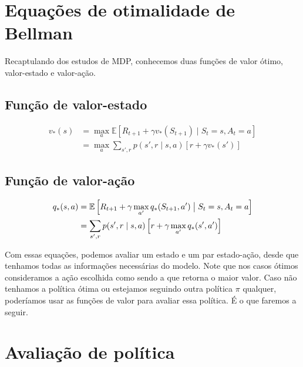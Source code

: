 \documentclass{article}
\begin{document}
    \section{Equações de otimalidade de Bellman}
    
        Recaptulando dos estudos de MDP, conhecemos duas funções de valor ótimo, valor-estado e valor-ação.
    
        \subsection{Função de valor-estado}
        
            \begin{equation}
                \begin{split}
                    v_*(s) & = \max_a \mathbb{E} \left[ R_{t+1} + \gamma v_*(S_{t+1}) \mid S_t = s, A_t = a \right] \\
                    & = \max_a \sum_{s', r} p(s',r \mid s,a) \left[ r + \gamma v_*(s') \right]
                \end{split}
            \end{equation}
        
        \subsection{Função de valor-ação}
    
            \begin{equation}
                \begin{split}
                    q_*(s,a) & = \mathbb{E} \left[ R_{t+1} + \gamma \max_{a'} q_*(S_{t+1}, a') \bigm\vert S_t = s, A_t = a \right] \\
                    & = \sum_{s', r} p(s',r \mid s,a) \left[ r + \gamma \max_{a'}q_*(s', a') \right]
                \end{split}
            \end{equation}
            
        Com essas equações, podemos avaliar um estado e um par estado-ação, desde que tenhamos todas as informações necessárias do modelo. Note que nos casos ótimos consideramos a ação escolhida como sendo a que retorna o maior valor. Caso não tenhamos a política ótima ou estejamos seguindo outra política $\pi$ qualquer, poderíamos usar as funções de valor para avaliar essa política. É o que faremos a seguir.
        
    \section{Avaliação de política}
    
\end{document}

